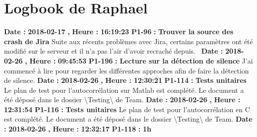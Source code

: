 \documentclass{article}%
\begin{document}
%
\section{Logbook de Raphael}%
\textbf{Date : }%
\textbf{2018{-}02{-}17}%
\textbf{,}%
\textbf{ Heure : }%
\textbf{16:19:23}%
\newline%
%
\textbf{P1{-}96 }%
\textbf{ : }%
\textbf{ Trouver la source des crash de Jira}%
\newline%
\newline%
%
Suite aux récents problèmes avec Jira, certains paramètres ont été modifié sur le serveur et il n'a pas l'air d'avoir recraché depuis.~\newline%
\newline%
%
\textbf{Date : }%
\textbf{2018{-}02{-}26}%
\textbf{,}%
\textbf{ Heure : }%
\textbf{09:45:53}%
\newline%
%
\textbf{P1{-}196 }%
\textbf{ : }%
\textbf{ Lecture sur la détection de silence}%
\newline%
\newline%
%
J'ai commencé à lire pour regarder les différentes approches afin de faire la détection de silence.\newline%
\newline%
%
\textbf{Date : }%
\textbf{2018{-}02{-}26}%
\textbf{,}%
\textbf{ Heure : }%
\textbf{12:30:21}%
\newline%
%
\textbf{P1{-}114 }%
\textbf{ : }%
\textbf{ Tests unitaires}%
\newline%
\newline%
%
Le plan de test pour l'autocorrélation sur Matlab est complété. Le document a été déposé dans le dossier \textbackslash{}Testing\textbackslash{} de Team.\newline%
\newline%
%
\textbf{Date : }%
\textbf{2018{-}02{-}26}%
\textbf{,}%
\textbf{ Heure : }%
\textbf{12:31:54}%
\newline%
%
\textbf{P1{-}116 }%
\textbf{ : }%
\textbf{ Tests unitaires}%
\newline%
\newline%
%
Le plan de test pour l'autocorrélation en C est complété. Le document a été déposé dans le dossier \textbackslash{}Testing\textbackslash{} de Team.\newline%
\newline%
%
\textbf{Date : }%
\textbf{2018{-}02{-}26}%
\textbf{,}%
\textbf{ Heure : }%
\textbf{12:32:17}%
\newline%
%
\textbf{P1{-}118 }%
\textbf{ : }%
\textbf{ 1h}%
\end{document}
